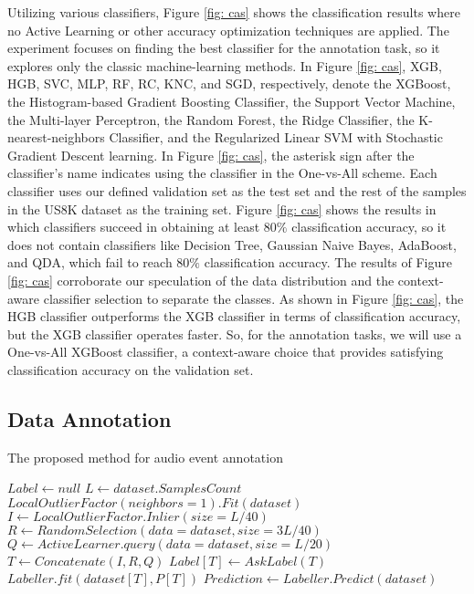 \documentclass{article}
\begin{document}
Utilizing various classifiers, Figure \ref{fig: cas} shows the classification results where no Active Learning or other accuracy optimization techniques are applied. The experiment focuses on finding the best classifier for the annotation task, so it explores only the classic machine-learning methods. In Figure \ref{fig: cas}, XGB, HGB, SVC, MLP, RF, RC, KNC, and SGD, respectively, denote the XGBoost, the Histogram-based Gradient Boosting Classifier, the Support Vector Machine, the Multi-layer Perceptron, the Random Forest, the Ridge Classifier, the K-nearest-neighbors Classifier, and the Regularized Linear SVM with Stochastic Gradient Descent learning. In Figure \ref{fig: cas}, the asterisk sign after the classifier's name indicates using the classifier in the One-vs-All scheme. Each classifier uses our defined validation set as the test set and the rest of the samples in the US8K dataset as the training set. Figure \ref{fig: cas} shows the results in which classifiers succeed in obtaining at least $80\%$ classification accuracy, so it does not contain classifiers like Decision Tree, Gaussian Naive Bayes, AdaBoost, and QDA, which fail to reach $80\%$ classification accuracy. The results of Figure \ref{fig: cas} corroborate our speculation of the data distribution and the context-aware classifier selection to separate the classes. As shown in Figure \ref{fig: cas}, the HGB classifier outperforms the XGB classifier in terms of classification accuracy, but the XGB classifier operates faster. So, for the annotation tasks, we will use a One-vs-All XGBoost classifier, a context-aware choice that provides satisfying classification accuracy on the validation set. 

\subsection{Data Annotation}

 \begin{algorithm}
	\caption{The proposed method for audio event annotation}\label{alg: label}
	$Label \gets null$\;
	$L \gets dataset.SamplesCount$\;
	$LocalOutlierFactor(neighbors=1).Fit(dataset)$\;
	$I \gets LocalOutlierFactor.Inlier(size=L/40)$\;
	$R \gets RandomSelection(data=dataset, size=3L/40)$\;
	$Q \gets ActiveLearner.query(data=dataset, size=L/20)$\;
	$T \gets Concatenate(I, R, Q)$\;
	$Label[T] \gets AskLabel(T)$\;
	$Labeller.fit(dataset[T], P[T])$\;
	$Prediction \gets Labeller.Predict(dataset)$\;
\end{algorithm}
\end{document}
